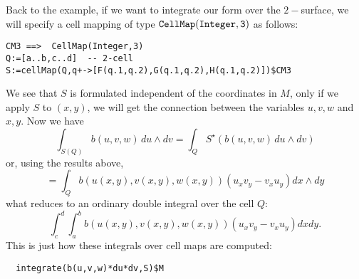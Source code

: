 \documentclass[12pt,a4paper]{article}
\begin{document}
Back to the example, if we want to integrate our form over the $2-$surface,
we will specify a cell mapping of type $\tt CellMap(Integer,3)$ as
follows:
\begin{lstlisting}
CM3 ==>  CellMap(Integer,3)
Q:=[a..b,c..d]  -- 2-cell
S:=cellMap(Q,q+->[F(q.1,q.2),G(q.1,q.2),H(q.1,q.2)])$CM3
\end{lstlisting}
We see that $S$ is formulated independent of the coordinates in $M$,
only if we apply $S$ to $(x,y)$, we will get the connection between
the variables $u,v,w$ and $x,y$. Now we have 
\begin{displaymath}
   \int_{S(Q)} b(u,v,w)\,du\wedge dv = \int_{Q} S^{\star}(b(u,v,w)\,du\wedge dv)
\end{displaymath}
or, using the results above,
\begin{displaymath}
   = \int_{Q} b(u(x,y),v(x,y),w(x,y))  (u_x v_y - v_x u_y) dx\wedge dy
\end{displaymath}
what reduces to an ordinary double integral over the cell $Q$:
\begin{displaymath}
\int_c^d \int_a^b b(u(x,y),v(x,y),w(x,y))  (u_x v_y - v_x u_y) dx dy.
\end{displaymath}
This is just how these integrals over cell maps are computed:
\begin{lstlisting}
  integrate(b(u,v,w)*du*dv,S)$M
\end{lstlisting}
\end{document}
